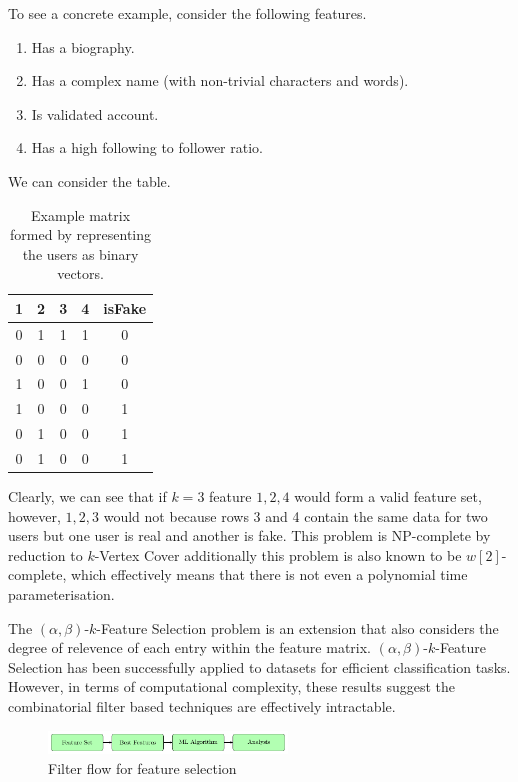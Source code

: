 \documentclass[conference]{IEEEtran}
\begin{document}
To see a concrete example, consider the following features.

\begin{enumerate}
	\item Has a biography.
	\item Has a complex name (with non-trivial characters and words).
	\item Is validated account.
	\item Has a high following to follower ratio.
\end{enumerate}

We can consider the table.

\begin{table}[h!]
	\centering
	\begin{tabular}{| c c c c | c |}
		\hline
		1 & 2 & 3 & 4 & isFake \\ [0.5ex]
		\hline
		0 & 1 & 1 & 1 & 0      \\
		0 & 0 & 0 & 0 & 0      \\
		1 & 0 & 0 & 1 & 0      \\
		1 & 0 & 0 & 0 & 1      \\
		0 & 1 & 0 & 0 & 1      \\
		0 & 1 & 0 & 0 & 1      \\ [1ex]
		\hline
	\end{tabular}
	\caption{Example matrix formed by representing the users as binary vectors.}
	\label{table:k-feat-select-example}
\end{table}

Clearly, we can see that if $k=3$ feature $1,2,4$ would form a valid feature set, however, $1,2,3$ would not because rows 3 and 4 contain the same data for two users but one user is real and another is fake. This problem is NP-complete by reduction to $k$-Vertex Cover\cite{DaviesRussell1994} additionally this problem is also known to be $w[2]$-complete\cite{CottaMoscato2003}, which effectively means that there is not even a polynomial time parameterisation.

The $(\alpha,\beta)$-$k$-Feature Selection problem is an extension that also considers the degree of relevence of each entry within the feature matrix. $(\alpha,\beta)$-$k$-Feature Selection has been successfully applied to datasets for efficient classification tasks\cite{MathiesonEtAl2017,NaeniSalehipour2021,RochadePaulaEtAl2016}. However, in terms of computational complexity, these results suggest the combinatorial filter based techniques are effectively intractable.

\begin{figure}[h]
	\begin{center}
		\includegraphics[width=2.5in]{filter-flow.pdf}
		\caption{Filter flow for feature selection}\label{fig:feat-filter-flow}
	\end{center}
\end{figure}
\end{document}

